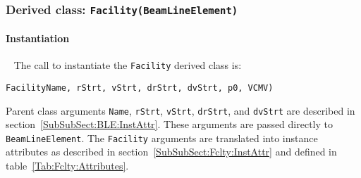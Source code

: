 \FloatBarrier

\subsubsection{Derived class: \texttt{Facility(BeamLineElement)}}

\paragraph{Instantiation} ~\newline
\noindent
The call to instantiate the \texttt{Facility} derived class is:
\begin{center}
  \texttt{FacilityName, rStrt, vStrt, drStrt, dvStrt, p0, VCMV)}
\end{center}
Parent class arguments \texttt{Name}, \texttt{rStrt}, \texttt{vStrt},
\texttt{drStrt}, and \texttt{dvStrt} are described in
section~\ref{SubSubSect:BLE:InstAttr}.
These arguments are passed directly to \texttt{BeamLineElement}.
The \texttt{Facility} arguments are translated into instance
attributes as described in section~\ref{SubSubSect:Fclty:InstAttr} and
defined in table~\ref{Tab:Fclty:Attributes}.

